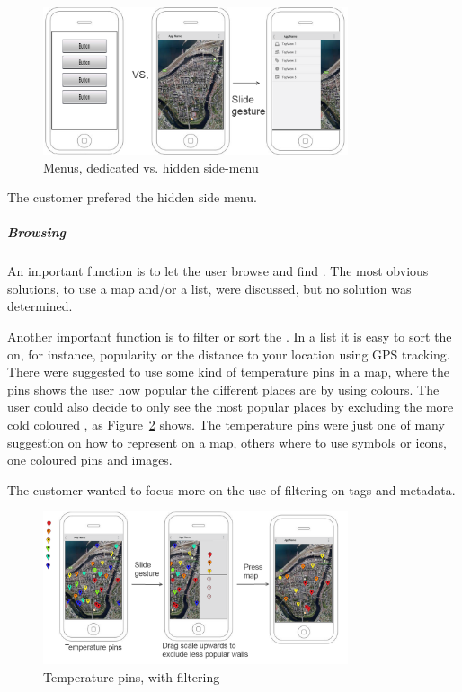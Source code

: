 \documentclass[11pt]{book}
\begin{document}
\begin{figure}[H]
    \centering
    \includegraphics[width=0.8\textwidth]{Figures/Phases/Sprint1/versiononeSliding.png}
    \caption{Menus, dedicated vs. hidden side-menu}
    \label{fig:phases_sprint1_uiVersionOneMenu}
\end{figure}

The customer prefered the hidden side menu.

\subparagraph{Browsing \wallentityp}
An important function is to let the user browse and find \wallentityp. The most obvious solutions, to use a map and/or a list, were discussed, but no solution was determined. 

Another important function is to filter or sort the \wallentityp. In a list it is easy to sort the \wallentityp on, for instance, popularity or the distance to your location using GPS tracking. There were suggested to use some kind of temperature pins in a map, where the pins shows the user how popular the different places are by using colours. The user could also decide to only see the most popular places by excluding the more cold coloured \wallentityp, as Figure~\ref{fig:phases_sprint1_uiVersionOneTempPings} shows. The temperature pins were just one of many suggestion on how to represent \wallentityp on a map, others where to use symbols or icons, one coloured pins and images.

The customer wanted to focus more on the use of filtering on tags and metadata.

\begin{figure}[H]
    \centering
    \includegraphics[width=0.8\textwidth]{Figures/Phases/Sprint1/versiononeTempPings.png}
    \caption{Temperature pins, with filtering}
    \label{fig:phases_sprint1_uiVersionOneTempPings}
\end{figure}
\end{document}
